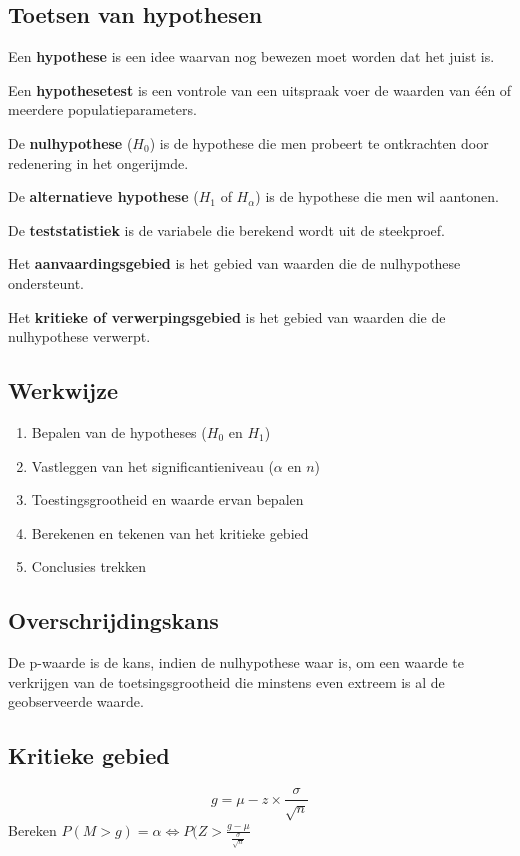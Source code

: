 \documentclass[a4paper,12pt]{article}
\begin{document}
\subsection{Toetsen van hypothesen}
Een \textbf{hypothese} is een idee waarvan nog bewezen moet worden dat het juist is.

Een \textbf{hypothesetest} is een vontrole van een uitspraak voer de waarden van één of meerdere populatieparameters.

De \textbf{nulhypothese} ($H_0$) is de hypothese die men probeert te ontkrachten door redenering in het ongerijmde.

De \textbf{alternatieve hypothese} ($H_1$ of $H_\alpha$) is de hypothese die men wil aantonen.

De \textbf{teststatistiek} is de variabele die berekend wordt uit de steekproef.

Het \textbf{aanvaardingsgebied} is het gebied van waarden die de nulhypothese ondersteunt.

Het \textbf{kritieke of verwerpingsgebied} is het gebied van waarden die de nulhypothese verwerpt.

\subsection{Werkwijze}
\begin{enumerate}
\item Bepalen van de hypotheses ($H_0$ en $H_1$)
\item Vastleggen van het significantieniveau ($\alpha$ en $n$)
\item Toestingsgrootheid en waarde ervan bepalen
\item Berekenen en tekenen van het kritieke gebied
\item Conclusies trekken
\end{enumerate}

\subsection{Overschrijdingskans}
De p-waarde is de kans, indien de nulhypothese waar is, om een waarde te verkrijgen van de toetsingsgrootheid die minstens even extreem is al de geobserveerde waarde.

\subsection{Kritieke gebied}
\begin{equation}
g=\mu-z\times \frac{\sigma}{\sqrt{n}}
\end{equation}
Bereken $P(M>g)=\alpha \Leftrightarrow P(Z>\frac{g-\mu}{\frac{\sigma}{\sqrt{n}}}$
\end{document}
